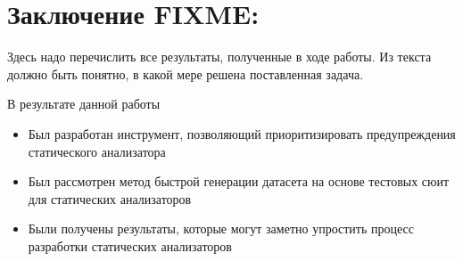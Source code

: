 \section{Заключение FIXME:}
\label{sec:Chapter5} 
Здесь надо перечислить все результаты, полученные в ходе работы. Из текста должно быть понятно, в какой мере решена поставленная задача.

В результате данной работы
\begin{itemize}
    \item Был разработан инструмент, позволяющий приоритизировать предупреждения статического анализатора
    \item Был рассмотрен метод быстрой генерации датасета на основе тестовых сюит для статических анализаторов
    \item Были получены результаты, которые могут заметно упростить процесс разработки статических анализаторов
\end{itemize}

\newpage
